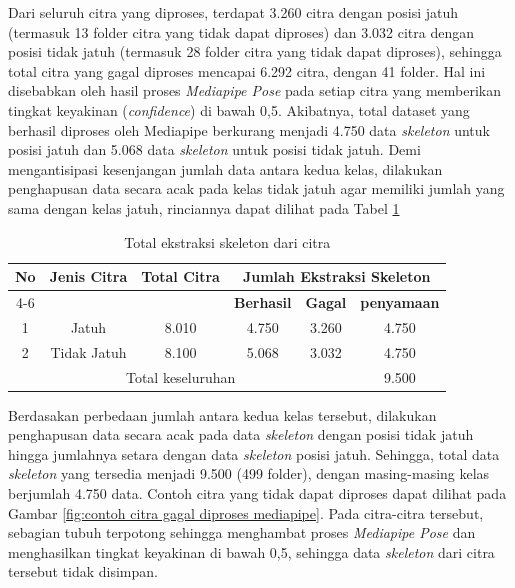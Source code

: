 Dari seluruh citra yang diproses, terdapat 3.260 citra dengan posisi jatuh (termasuk 13 folder citra yang tidak dapat diproses) dan 3.032 citra dengan posisi tidak jatuh (termasuk 28 folder citra yang tidak dapat diproses), sehingga total citra yang gagal diproses mencapai 6.292 citra, dengan 41 folder. Hal ini disebabkan oleh hasil proses \textit{Mediapipe Pose} pada setiap citra yang memberikan tingkat keyakinan (\textit{confidence}) di bawah 0,5. Akibatnya, total dataset yang berhasil diproses oleh Mediapipe berkurang menjadi 4.750 data \textit{skeleton} untuk posisi jatuh dan 5.068 data \textit{skeleton} untuk posisi tidak jatuh. Demi mengantisipasi kesenjangan jumlah data antara kedua kelas, dilakukan penghapusan data secara acak pada kelas tidak jatuh agar memiliki jumlah yang sama dengan kelas jatuh, rinciannya dapat dilihat pada Tabel \ref{tab:total skeleton} \par

\begin{table}[htbp]
    \centering
    \caption{Total ekstraksi skeleton dari citra}
    \label{tab:total skeleton}
    \begin{tabular}{|c|c|c|c|c|c|}
        \hline
        \multirow{2}{*}{\textbf{No}} & \multirow{2}{*}{\textbf{Jenis Citra}} & \multirow{2}{*}{\textbf{Total Citra}} & \multicolumn{3}{c|}{\textbf{Jumlah Ekstraksi Skeleton}} \\ \cline{4-6}
        & & & \textbf{Berhasil} & \textbf{Gagal} & \textbf{penyamaan} \\ \hline
        1 & Jatuh & 8.010 & 4.750 & 3.260 & 4.750 \\ \hline
        2 & Tidak Jatuh & 8.100 & 5.068 & 3.032 & 4.750 \\ \hline
        \multicolumn{5}{|c|}{Total keseluruhan} & 9.500 \\ \hline
    \end{tabular}
\end{table}

Berdasakan perbedaan jumlah antara kedua kelas tersebut, dilakukan penghapusan data secara acak pada data \textit{skeleton} dengan posisi tidak jatuh hingga jumlahnya setara dengan data \textit{skeleton} posisi jatuh. Sehingga, total data \textit{skeleton} yang tersedia menjadi 9.500 (499 folder), dengan masing-masing kelas berjumlah 4.750 data. Contoh citra yang tidak dapat diproses dapat dilihat pada Gambar \ref{fig:contoh citra gagal diproses mediapipe}. Pada citra-citra tersebut, sebagian tubuh terpotong sehingga menghambat proses \textit{Mediapipe Pose} dan menghasilkan tingkat keyakinan di bawah 0,5, sehingga data \textit{skeleton} dari citra tersebut tidak disimpan. \par

